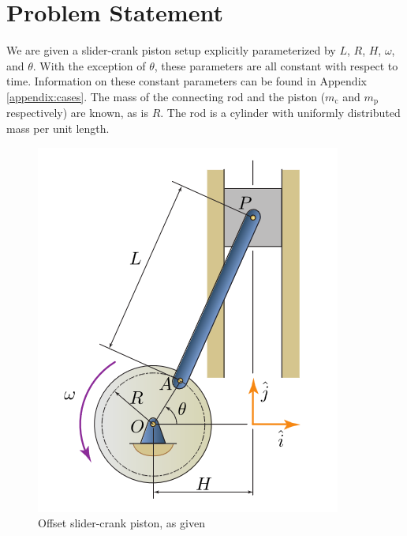 \documentclass[nofoot,pdf-a,balance,colorlinks,upint,subscriptcorrection,varvw,mathalfa=cal=boondoxo]{asmeconf}
\begin{document}
    \section{Problem Statement}

    We are given a slider-crank piston setup explicitly parameterized by $L$, $R$, $H$, $\omega$, and $\theta$. With the exception of $\theta$, these parameters are all constant with respect to time. Information on these constant parameters can be found in Appendix \ref{appendix:cases}. The mass of the connecting rod and the piston ($m_{\textrm{c}}$ and $m_{\textrm{p}}$ respectively) are known, as is $R$. The rod is a cylinder with uniformly distributed mass per unit length.
    
    \begin{figure}[H]
        \centering
    	\includegraphics[scale=0.45]{problem_diagram.png}
    	\caption{Offset slider-crank piston, as given}\label{fig:diagram}
    \end{figure}

    \begin{table}[H]
        \caption[Table]{Case-Independent Known Values}\label{tab:given}
    \end{table}
\end{document}
